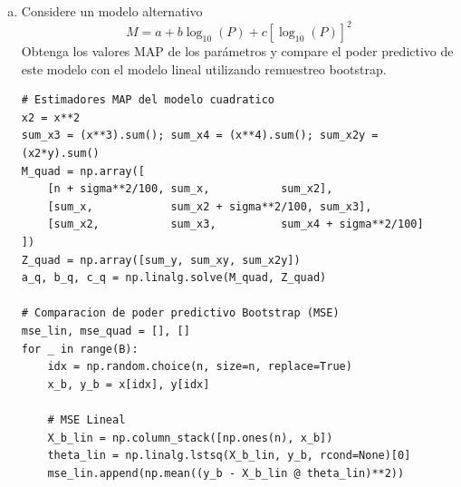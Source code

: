 \documentclass[a4paper]{article}
\begin{document}
\begin{enumerate}[a)]
\begin{center}
\end{center}

La comparación de distribuciones mediante la prueba de Kolmogorov--Smirnov se realizó como una prueba no paramétrica de dos muestras \cite{press1992}. El resultado fue:
\begin{equation}
  D = 0.7646, \qquad p\text{-valor}=6.70\times 10^{-11}.
\end{equation}
Como el $p$-valor es muy pequeño, se rechaza la hipótesis nula de que los
residuos observados y los residuos simulados provienen de la misma
distribución. Esto sugiere que el modelo lineal con errores normales de
desviación estándar fija $\sigma=0.3$ no reproduce completamente la
distribución empírica de los residuos.
	
	\item Considere un modelo alternativo
	$$
	M = a+b\log_{10}(P) + c[\log_{10}(P)]^2
	$$
	Obtenga los valores MAP de los parámetros y compare el poder predictivo de este modelo con el modelo lineal utilizando remuestreo bootstrap.
	
	\begin{lstlisting}
# Estimadores MAP del modelo cuadratico
x2 = x**2
sum_x3 = (x**3).sum(); sum_x4 = (x**4).sum(); sum_x2y = (x2*y).sum()
M_quad = np.array([
    [n + sigma**2/100, sum_x,           sum_x2],
    [sum_x,            sum_x2 + sigma**2/100, sum_x3],
    [sum_x2,           sum_x3,          sum_x4 + sigma**2/100]
])
Z_quad = np.array([sum_y, sum_xy, sum_x2y])
a_q, b_q, c_q = np.linalg.solve(M_quad, Z_quad)

# Comparacion de poder predictivo Bootstrap (MSE)
mse_lin, mse_quad = [], []
for _ in range(B):
    idx = np.random.choice(n, size=n, replace=True)
    x_b, y_b = x[idx], y[idx]
    
    # MSE Lineal
    X_b_lin = np.column_stack([np.ones(n), x_b])
    theta_lin = np.linalg.lstsq(X_b_lin, y_b, rcond=None)[0]
    mse_lin.append(np.mean((y_b - X_b_lin @ theta_lin)**2))
    

\end{lstlisting}
\end{enumerate}
\end{document}
